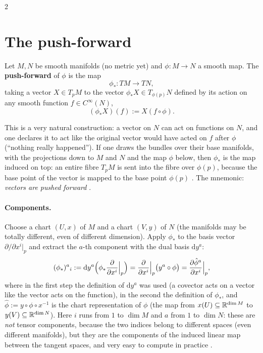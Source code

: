 \begin{paracol}{2}
\section{The push-forward}\label{sec:c11-push}

\begin{definition}\label{def:c11-push}
Let $M,N$ be smooth manifolds (no metric yet) and $\phi\colon M\to N$ a smooth map. The \textbf{push-forward} of $\phi$ is the map
\[
  \phi_*\colon TM\to TN,
\]
taking a vector $X\in T_pM$ to the vector $\phi_*X\in T_{\phi(p)}N$ defined by its action on any smooth function $f\in C^\infty(N)$,
\[
  (\phi_*X)(f):=X(f\circ\phi).
\]
\end{definition}
This is a very natural construction: a vector on $N$ can act on functions on $N$, and one declares it to act like the original vector would have acted on $f$ after $\phi$ (``nothing really happened''). If one draws the bundles over their base manifolds, with the projections down to $M$ and $N$ and the map $\phi$ below, then $\phi_*$ is the map induced on top: an entire fibre $T_pM$ is sent into the fibre over $\phi(p)$, because the base point of the vector is mapped to the base point $\phi(p)$ . The mnemonic: \emph{vectors are pushed forward} .

\paragraph{Components.} Choose a chart $(U,x)$ of $M$ and a chart $(V,y)$ of $N$ (the manifolds may be totally different, even of different dimension). Apply $\phi_*$ to the basis vector $\partial/\partial x^i|_p$ and extract the $a$-th component with the dual basis $\mathrm dy^a$:
\[
  (\phi_*)^a{}_i:=\mathrm dy^a\Bigl(\phi_*\frac{\partial}{\partial x^i}\Big|_p\Bigr)=\frac{\partial}{\partial x^i}\Big|_p\bigl(y^a\circ\phi\bigr)=\frac{\partial\hat\phi^a}{\partial x^i}\Big|_p,
\]
where in the first step the definition of $\mathrm dy^a$ was used (a covector acts on a vector like the vector acts on the function), in the second the definition of $\phi_*$, and $\hat\phi:=y\circ\phi\circ x^{-1}$ is the chart representation of $\phi$ (the map from $x(U)\subseteq\mathbb{R}^{\dim M}$ to $y(V)\subseteq\mathbb{R}^{\dim N}$). Here $i$ runs from $1$ to $\dim M$ and $a$ from $1$ to $\dim N$: these are \emph{not} tensor components, because the two indices belong to different spaces (even different manifolds), but they are the components of the induced linear map between the tangent spaces, and very easy to compute in practice .


\end{paracol}

